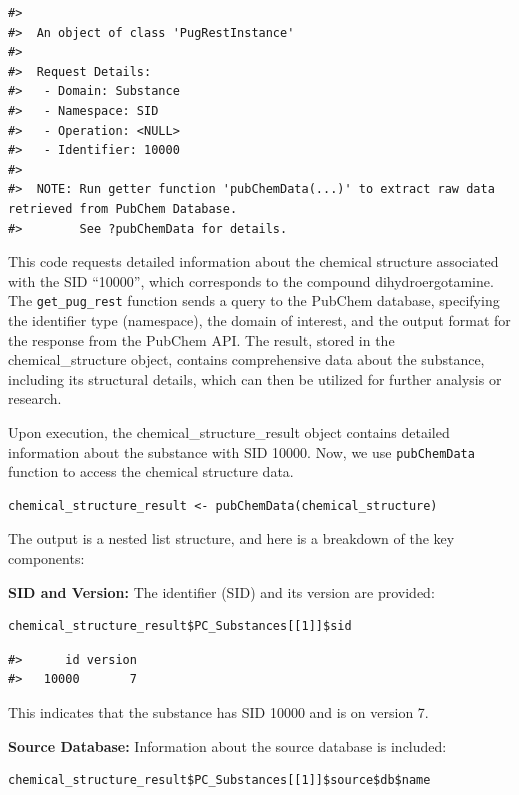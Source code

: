 \begin{verbatim}
#> 
#>  An object of class 'PugRestInstance'
#> 
#>  Request Details:  
#>   - Domain: Substance
#>   - Namespace: SID
#>   - Operation: <NULL>
#>   - Identifier: 10000
#> 
#>  NOTE: Run getter function 'pubChemData(...)' to extract raw data retrieved from PubChem Database. 
#>        See ?pubChemData for details.
\end{verbatim}

This code requests detailed information about the chemical structure associated with the SID ``10000'', which corresponds to the compound dihydroergotamine. The \texttt{get\_pug\_rest} function sends a query to the PubChem database, specifying the identifier type (namespace), the domain of interest, and the output format for the response from the PubChem API. The result, stored in the chemical\_structure object, contains comprehensive data about the substance, including its structural details, which can then be utilized for further analysis or research.

Upon execution, the chemical\_structure\_result object contains detailed information about the substance with SID 10000. Now, we use \texttt{pubChemData} function to access the chemical structure data.

\begin{verbatim}
chemical_structure_result <- pubChemData(chemical_structure)
\end{verbatim}

The output is a nested list structure, and here is a breakdown of the key components:

\textbf{SID and Version:}
The identifier (SID) and its version are provided:

\begin{verbatim}
chemical_structure_result$PC_Substances[[1]]$sid
\end{verbatim}

\begin{verbatim}
#>      id version 
#>   10000       7
\end{verbatim}

This indicates that the substance has SID 10000 and is on version 7.

\textbf{Source Database:}
Information about the source database is included:

\begin{verbatim}
chemical_structure_result$PC_Substances[[1]]$source$db$name
\end{verbatim}

